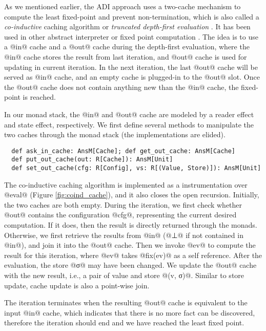 As we mentioned earlier, the ADI approach uses a two-cache mechanism to
compute the least fixed-point and prevent non-termination, which is also called a
\textit{co-inductive} caching algorithm or \textit{truncated depth-first
evaluation} \cite{Rosendahl:AbsIntPL}. It has been used in other abstract
interpreter or fixed point computation
\cite{DBLP:journals/pacmpl/DaraisLNH17, Wei:2018:RAA:3243631.3236800,
  Rosendahl:AbsIntPL}. The idea is to use a @in@ cache and a @out@ cache during
the depth-first evaluation, where the @in@ cache stores the result from last
iteration, and @out@ cache is used for updating in current iteration. In the next
iteration, the last @out@ cache will be served as @in@ cache, and an empty cache
is plugged-in to the @out@ slot. Once the @out@ cache does not contain anything
new than the @in@ cache, the fixed-point is reached.

In our monad stack, the @in@ and @out@ cache are modeled by a reader effect and
state effect, respectively. We first define several methods to manipulate
the two caches through the monad stack (the implementations are elided).
\begin{lstlisting}
  def ask_in_cache: AnsM[Cache]; def get_out_cache: AnsM[Cache]
  def put_out_cache(out: R[Cache]): AnsM[Unit]
  def set_out_cache(cfg: R[Config], vs: R[(Value, Store)]): AnsM[Unit]
\end{lstlisting}

The co-inductive caching algorithm is implemented as a instrumentation over
@eval@ (Figure \ref{fig:coind_cache}), and it also closes the open recursion.
Initially, the two caches are both empty.
During the iteration, we first check whether @out@ contains the configuration
@cfg@, representing the current desired computation. If it does, then the result
is directly returned through the monads.
Otherwise, we first retrieve the results from @in@ (@⊥@ if not contained in
@in@), and join it into the @out@ cache.
Then we invoke @ev@ to compute the result for this iteration, where @ev@ takes
@fix(ev)@ as a self reference.
After the evaluation, the store @σ@ may have been changed. We update the
@out@ cache with the new result, i.e., a pair of value and store @(v, σ)@.
Similar to store update, cache update is also a point-wise join.

The iteration terminates when the resulting @out@ cache is equivalent to the
input @in@ cache, which indicates that there is no more fact can be discovered,
therefore the iteration should end and we have reached the least fixed point.

